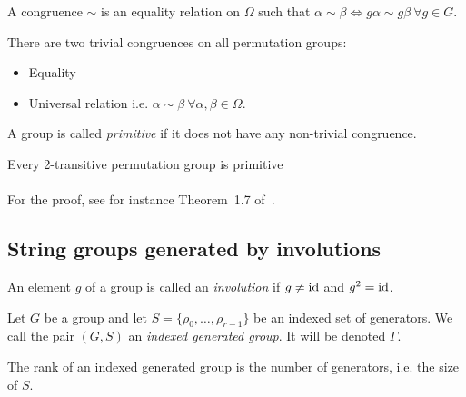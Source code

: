 \begin{definition}[Congruence]
  A congruence $\sim$ is an equality relation on $\Omega$ such that $\alpha \sim \beta \Leftrightarrow g\alpha \sim g\beta \ \forall g \in G$.
\end{definition}

There are two trivial congruences on all permutation groups:
\begin{itemize}
  \item Equality
  \item Universal relation i.e. $\alpha \sim \beta \ \forall \alpha, \beta \in \Omega$.
\end{itemize}

\begin{definition}
  A group is called \textit{primitive} if it does not have any non-trivial congruence.
\end{definition}

\begin{property}
  \label{2-transitive-primitive}
  Every 2-transitive permutation group is primitive
\end{property}

\paragraph{}
For the proof, see for instance Theorem~1.7 of~\cite{permutationGroups}.

\subsection{String groups generated by involutions}

\begin{definition}[Involution]
  An element $g$ of a group is called an \textit{involution} if $g \neq \operatorname{id}$ and $g^2 = \operatorname{id}$.
\end{definition}

\begin{definition}
  Let $G$ be a group and let $S = \{\rho_0, \dots, \rho_{r-1}\}$ be an indexed set of generators.
  We call the pair $(G,S)$ an \textit{indexed generated group}. It will be denoted $\Gamma$.
\end{definition}

\begin{definition}
  The rank of an indexed generated group is the number of generators, i.e. the size of $S$.
\end{definition}

